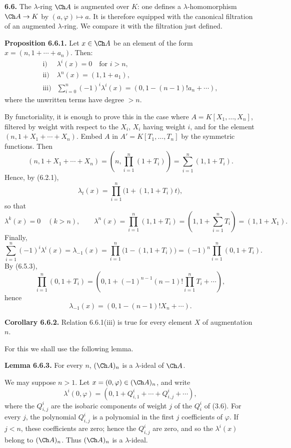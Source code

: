 \documentclass[11pt]{article}
\begin{document}
\textbf{6.6.} The \(\lambda\)-ring \(\Ch A\) is augmented over \(K\): one defines a \(\lambda\)-homomorphism \(\Ch A\to K\) by \((a,\varphi)\mapsto a\). It is therefore equipped with the canonical filtration of an augmented \(\lambda\)-ring. We compare it with the filtration just defined.

\textbf{Proposition 6.6.1.} Let \(x\in\Ch A\) be an element of the form \(x=(n,1+\cdots+a_n)\). Then:
\[
\begin{array}{ll}
\text{i)}& \lambda^i(x)=0\quad\text{for }i>n,\\[0.3em]
\text{ii)}& \lambda^n(x)=(1,1+a_1),\\[0.3em]
\text{iii)}& \displaystyle\sum_{i=0}^n(-1)^i\lambda^i(x)
       =(0,1-(n-1)!a_n+\cdots),
\end{array}
\]
where the unwritten terms have degree \(>n\).

By functoriality, it is enough to prove this in the case where
\(A=K[X_1,\ldots,X_n]\), filtered by weight with respect to the \(X_i\), \(X_i\) having weight \(i\), and for the element \((n,1+X_1+\cdots+X_n)\). Embed \(A\) in \(A'=K[T_1,\ldots,T_n]\) by the symmetric functions. Then
\[
 (n,1+X_1+\cdots+X_n)
 =
 \left(n,\prod_{i=1}^n(1+T_i)\right)
 =
 \sum_{i=1}^n(1,1+T_i).
\]
Hence, by (6.2.1),
\[
  \lambda_t(x)=\prod_{i=1}^n\bigl(1+(1,1+T_i)t\bigr),
\]
so that
\[
  \lambda^k(x)=0\quad(k>n),\qquad
  \lambda^n(x)=\prod_{i=1}^n(1,1+T_i)
   =\left(1,1+\sum_{i=1}^nT_i\right)=(1,1+X_1).
\]
Finally,
\[
  \sum_{i=1}^n(-1)^i\lambda^i(x)=\lambda_{-1}(x)
  =\prod_{i=1}^n\bigl(1-(1,1+T_i)\bigr)
  =(-1)^n\prod_{i=1}^n(0,1+T_i).
\]
By (6.5.3),
\[
  \prod_{i=1}^n(0,1+T_i)
  =
  \left(0,1+(-1)^{n-1}(n-1)!\prod_{i=1}^nT_i+\cdots\right),
\]
hence
\[
  \lambda_{-1}(x)=(0,1-(n-1)!X_n+\cdots).
\]

\textbf{Corollary 6.6.2.} Relation 6.6.1(iii) is true for every element \(X\) of augmentation \(n\).

For this we shall use the following lemma.

\textbf{Lemma 6.6.3.} For every \(n\), \((\Ch A)_n\) is a \(\lambda\)-ideal of \(\Ch A\).

We may suppose \(n>1\). Let \(x=(0,\varphi)\in(\Ch A)_n\), and write
\[
  \lambda^i(0,\varphi)=(0,1+Q^i_{i,1}+\cdots+Q^i_{i,j}+\cdots),
\]
where the \(Q^i_{i,j}\) are the isobaric components of weight \(j\) of the \(Q^i_i\) of (3.6). For every \(j\), the polynomial \(Q^i_{i,j}\) is a polynomial in the first \(j\) coefficients of \(\varphi\). If \(j<n\), these coefficients are zero; hence the \(Q^i_{i,j}\) are zero, and so the \(\lambda^i(x)\) belong to \((\Ch A)_n\). Thus \((\Ch A)_n\) is a \(\lambda\)-ideal.
\end{document}
